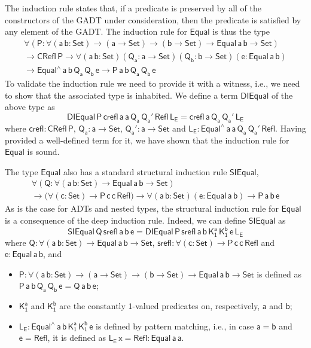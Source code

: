 \documentclass[acmsmall,screen,review,anonymous]{acmart}
\theoremstyle{definition}
\begin{document}
The induction rule states that,
if a predicate is preserved by all of the constructors of the GADT under consideration,
then the predicate is satisfied by any element of the GADT.
The induction rule for $\mathsf{Equal}$ is thus the type
\begin{multline*}
\mathsf{\forall (P : \forall (a\,b : Set) \to (a \to Set) \to (b \to Set) \to Equal\,a\,b \to Set)} \\
\mathsf{\to CRefl\,P \to \forall (a\,b : Set) (Q_a : a \to Set) (Q_b : b \to Set) (e: Equal\,a\,b)} \\
	\mathsf{\to Equal^{\wedge}\,a\,b\,Q_a\,Q_b\,e \to P\,a\,b\,Q_a\,Q_b\,e}
\end{multline*}
To validate the induction rule we need to provide it with a witness, i.e.,
we need to show that the associated type is inhabited.
We define a term $\mathsf{DIEqual}$ of the above type as
\[
\mathsf{DIEqual\,P\,crefl\,a\,a\,Q_a\,Q_a'\,Refl\,L_E = crefl\,a\,Q_a\,Q_a'\,L_E}
\]
where
$\mathsf{crefl : CRefl\,P}$,
$\mathsf{Q_a : a \to Set}$, $\mathsf{Q_a' : a \to Set}$
and $\mathsf{L_E : Equal^{\wedge}\,a\,a\,Q_a\,Q_a'\,Refl}$.
Having provided a well-defined term for it,
we have shown that the induction rule for $\mathsf{Equal}$ is sound.

The type $\mathsf{Equal}$ also has a standard structural induction rule $\mathsf{SIEqual}$,
\begin{multline*}
\mathsf{\forall (Q : \forall (a\,b : Set) \to Equal\,a\,b \to Set)} \\
\mathsf{\to \big( \forall (c : Set) \to P\,c\,c\,Refl \big)
	\to \forall (a\,b : Set) (e: Equal\,a\,b) \to P\,a\,b\,e}
\end{multline*}
As is the case for ADTs and nested types,
the structural induction rule for $\mathsf{Equal}$ is a consequence of the deep induction rule.
Indeed, we can define $\mathsf{SIEqual}$ as
\[
\mathsf{SIEqual\,Q\,srefl\,a\,b\,e = DIEqual\,P\,srefl\,a\,b\,K^a_1\,K^b_1\,e\,L_E}
\]
where
$\mathsf{Q : \forall (a\,b : Set) \to Equal\,a\,b \to Set}$,
$\mathsf{srefl: \forall (c : Set) \to P\,c\,c\,Refl}$
and $\mathsf{e : Equal\,a\,b}$, and
\begin{itemize}
\item $\mathsf{P : \forall (a\,b : Set) \to (a \to Set) \to (b \to Set) \to Equal\,a\,b \to Set}$ is defined as
$\mathsf{P\,a\,b\,Q_a\,Q_b\,e = Q\,a\,b\,e}$;
\item $\mathsf{K^a_1}$ and $\mathsf{K^b_1}$ are the constantly $\mathsf{1}$-valued predicates on, respectively, $\mathsf{a}$ and $\mathsf{b}$;
\item $\mathsf{L_E : Equal^{\wedge}\,a\,b\,K^a_1\,K^b_1\,e}$ is defined by pattern matching,
i.e., in case $\mathsf{a = b}$ and $\mathsf{e = Refl}$,
it is defined as $\mathsf{L_E\,x = Refl : Equal\,a\,a}$.
\end{itemize}
\end{document}
